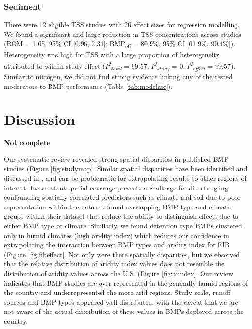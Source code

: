 \documentclass[utf8]{FrontiersinHarvard}
\begin{document}
\hypertarget{sediment}{%
\subsubsection{Sediment}\label{sediment}}

There were 12 eligible TSS studies with 26 effect sizes for regression modelling.
We found a significant and large reduction in TSS concentrations across studies (ROM = 1.65, 95\% CI {[}0.96, 2.34{]}; BMP\textsubscript{eff} = 80.9\%, 95\% CI {[}61.9\%, 90.4\%{]}).
Heterogeneity was high for TSS with a large proportion of heterogeneity attributed to within study effect (\textit{I\textsuperscript{2}\textsubscript{total}} = 99.57, \textit{I\textsuperscript{2}\textsubscript{study}} = 0, \textit{I\textsuperscript{2}\textsubscript{effect}} = 99.57).
Similar to nitrogen, we did not find strong evidence linking any of the tested moderators to BMP performance (Table \ref{tab:modelaic}).

\hypertarget{discussion}{%
\section{Discussion}\label{discussion}}

\textbf{Not complete}

Our systematic review revealed strong spatial disparities in published BMP studies (Figure \ref{fig:studymap}.
Similar spatial disparities have been identified and discussed in \citet{kochNitrogenRemovalStormwater2014}, \citet{grudzinskiDoesRiparianFencing2020} and can be problematic for extrapolating results to other regions of interest.
Inconsistent spatial coverage presents a challenge for disentangling confounding spatially correlated predictors such as climate and soil due to poor representation within the dataset.
\citet{horvathEffectsRegionalClimate2023} found overlapping BMP type and climate groups within their dataset that reduce the ability to distinguish effects due to either BMP type or climate.
Similarly, we found detention type BMPs clustered only in humid climates (high aridity index) which reduces our confidence in extrapolating the interaction between BMP types and aridity index for FIB (Figure \ref{fig:fibeffect}.
Not only were there spatially disparities, but we observed that the relative distribution of aridity index values does not resemble the distribution of aridity values across the U.S. (Figure \ref{fig:aiindex}.
Our review indicates that BMP studies are over represented in the generally humid regions of the country and underrepresented the more arid regions.
Study scale, runoff sources and BMP types appeared well distributed, with the caveat that we are not aware of the actual distribution of these values in BMPs deployed across the country.
\end{document}
